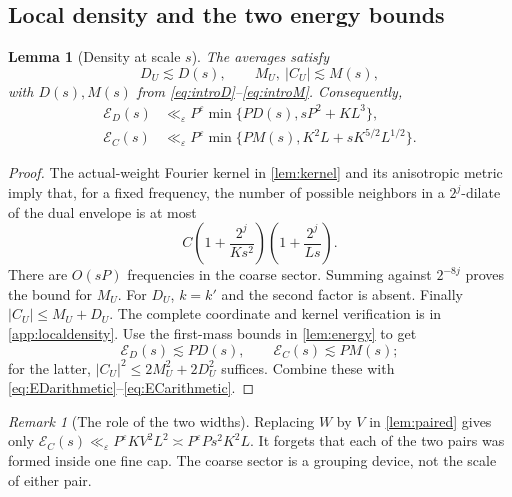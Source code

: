 \documentclass[11pt,reqno]{amsart}
\numberwithin{equation}{section}
\newtheorem{lemma}[lemma]{Lemma}
\theoremstyle{definition}
\theoremstyle{remark}
\newtheorem{remark}[remark]{Remark}
\newcommand{\eps}{\varepsilon}
\newcommand{\ED}{\mathcal E_D}
\newcommand{\EC}{\mathcal E_C}
\begin{document}
\subsection{Local density and the two energy bounds}
\begin{lemma}[Density at scale $s$]\label{lem:density}
The averages satisfy
\begin{equation}\label{eq:densitybounds}
 D_U\lesssim D(s),\qquad M_U,\ |C_U|\lesssim M(s),
\end{equation}
with $D(s),M(s)$ from \eqref{eq:introD}--\eqref{eq:introM}.
Consequently,
\begin{align}
 \ED(s)&\ll_\eps P^\eps\min\{PD(s),sP^2+KL^3\},\label{eq:EDfinal}\\
 \EC(s)&\ll_\eps P^\eps\min\{PM(s),K^2L+sK^{5/2}L^{1/2}\}.
       \label{eq:ECfinal}
\end{align}
\end{lemma}
\begin{proof}
The actual-weight Fourier kernel in \cref{lem:kernel} and its anisotropic metric imply
that, for a fixed frequency, the number of possible neighbors in a $2^j$-dilate of the
dual envelope is at most
\[
 C\left(1+\frac{2^j}{Ks^2}\right)
  \left(1+\frac{2^j}{Ls}\right).
\]
There are $O(sP)$ frequencies in the coarse sector. Summing against $2^{-8j}$ proves
the bound for $M_U$. For $D_U$, $k=k'$ and the second factor is absent.
Finally $|C_U|\le M_U+D_U$. The complete coordinate and kernel verification is in
\cref{app:localdensity}.
Use the first-mass bounds in \cref{lem:energy} to get
\begin{equation}\label{eq:densityenergies}
 \ED(s)\lesssim PD(s),\qquad \EC(s)\lesssim PM(s);
\end{equation}
for the latter, $|C_U|^2\le2M_U^2+2D_U^2$ suffices.
Combine these with \eqref{eq:EDarithmetic}--\eqref{eq:ECarithmetic}.
\end{proof}

\begin{remark}[The role of the two widths]\label{rem:coarse}
Replacing $W$ by $V$ in \cref{lem:paired} gives only
$\EC(s)\ll_\eps P^\eps KV^2L^2\asymp P^\eps Ps^2K^2L$.
It forgets that each of the two pairs was formed inside one fine cap.
The coarse sector is a grouping device, not the scale of either pair.
\end{remark}
\end{document}
